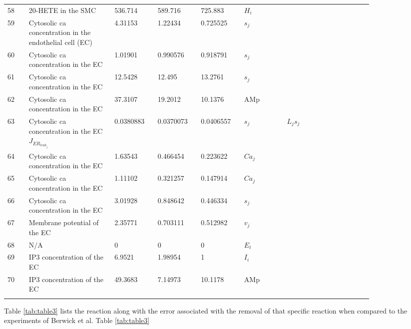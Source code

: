 \documentclass[]{article}
\newcommand{\ca}{\gls{ca}\xspace}
\begin{document}
\begin{longtable}[h!] { p{0.05\linewidth}  p{0.2\linewidth} p{0.1\linewidth}  p{0.10\linewidth} p{0.10\linewidth} p{0.1\linewidth}   p{0.2\linewidth} }
58	&20-HETE in the SMC	&536.714	&	589.716	&	725.883	&$H_i$\\
59	&Cytosolic \ca concentration in the endothelial cell (EC)	&4.31153	&	1.22434	&	0.725525&	$s_j$\\
60	&Cytosolic \ca concentration in the EC	&1.01901	&	0.990576	&	0.918791&	$s_j$\\
61	&Cytosolic \ca concentration in the EC	&12.5428	&	12.495	&	13.2761&	$s_j$\\
62	&Cytosolic \ca concentration in the EC	&37.3107	&	19.2012		&10.1376	&AMp\\
63	&Cytosolic \ca concentration in the EC$J_{ER_{leak_{j}}}$&	0.0380883	&	0.0370073	&	0.0406557	&$s_j$&$ L_{j}s_j $ \\
64	&Cytosolic \ca concentration in the EC	&1.63543	&	0.466454	&	0.223622&	$Ca_j$\\
65&	Cytosolic \ca concentration in the EC&	1.11102		&0.321257	&	0.147914	&$Ca_j$\\
66	&Cytosolic \ca concentration in the EC	&3.01928	&	0.848642	&	0.446334&	$s_j$\\
67	&Membrane potential of the EC&	2.35771	&	0.703111	&	0.512982&	$v_j$\\
68	&N/A	&0	&	0	&	0&	$E_t$\\
69	&IP3 concentration of the EC&	6.9521	&	1.98954	&	1&	$I_i$\\
70&	IP3 concentration of the EC	&49.3683	&	7.14973	&	10.1178&	AMp\\
\label{tab:table2}
\end{longtable}
Table \ref{tab:table3} lists the reaction along with the error associated with the removal of that specific reaction when compared to the experiments of Berwick et al. 
Table \ref{tab:table3}
\end{document}
